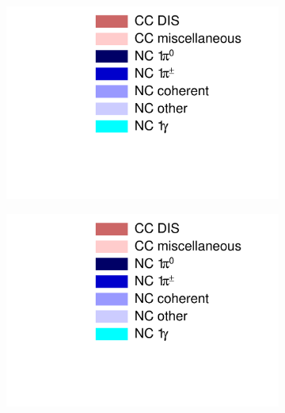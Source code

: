 \begin{figure}[!h]
\begin{subfigure}{.24\textwidth}
\end{subfigure}
\begin{subfigure}{.24\textwidth}
  \centering
  \includegraphics[width=\linewidth, trim={5mm 60mm 30mm 0mm}, clip]{figs/legend2}
\end{subfigure}
\begin{subfigure}{.24\textwidth}
  \centering
  \includegraphics[width=\linewidth, trim={5mm 0mm 30mm 80mm}, clip]{figs/legend2}
\end{subfigure}


\end{figure}
